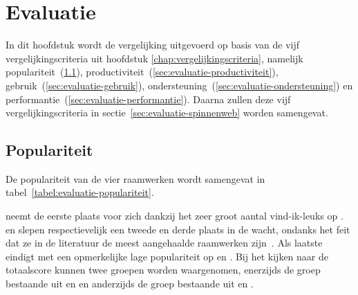 \chapter{Evaluatie}
\label{chap:evaluatie}

In dit hoofdstuk wordt de vergelijking uitgevoerd op basis van de vijf vergelijkingscriteria uit hoofdstuk \ref{chap:vergelijkingscriteria}, namelijk populariteit~(\ref{sec:evaluatie-populariteit}), productiviteit~(\ref{sec:evaluatie-productiviteit}), gebruik~(\ref{sec:evaluatie-gebruik}), ondersteuning~(\ref{sec:evaluatie-ondersteuning}) en performantie~(\ref{sec:evaluatie-performantie}). 
Daarna zullen deze vijf vergelijkingscriteria in sectie~\ref{sec:evaluatie-spinnenweb} worden samengevat.


\section{Populariteit} %
\label{sec:evaluatie-populariteit}

De populariteit van de vier raamwerken wordt samengevat in tabel~\ref{tabel:evaluatie-populariteit}. 

\begin{table}[H]
\centering
{}
\caption{Overzicht van populariteit voor \st{}~(\sta), \kendo{}~(\kendoa), \jqm{}~(\jqma) en \lungo{}~(\lungoa).}
\label{tabel:evaluatie-populariteit}
\end{table}

\kendo{} neemt de eerste plaats voor zich dankzij het zeer groot aantal vind-ik-leuks op \fb.
\jqm{} en \st{} slepen respectievelijk een tweede en derde plaats in de wacht, ondanks het feit dat ze in de literatuur de meest aangehaalde raamwerken zijn~\cite{David2011,Firtman2013,Hales2012,Oeflman2011}. 
Als laatste eindigt \lungo{} met een opmerkelijke lage populariteit op \so{} en \fb.
Bij het kijken naar de totaalscore kunnen twee groepen worden waargenomen, enerzijds de groep bestaande uit \kendo{} en \jqm{} en anderzijds de groep bestaande uit \st{} en \lungo{}.

